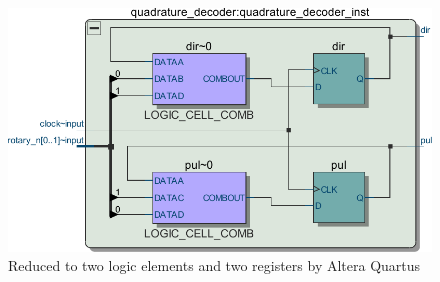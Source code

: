 \documentclass{article}
\begin{document}
\begin{figure}
\centering
\includegraphics[width=\textwidth]{quadrature_decoder_quartus.pdf}
\caption{Reduced to two logic elements and two registers by Altera Quartus}
\end{figure}
\end{document}
